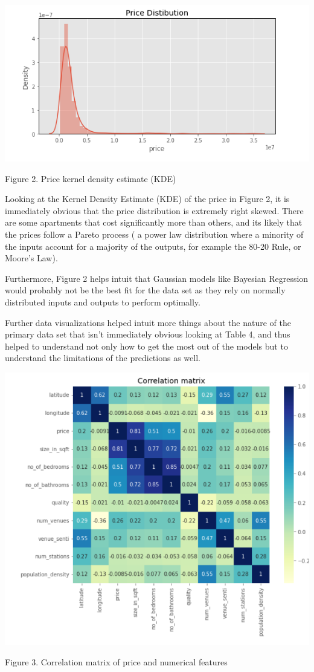 \documentclass[conference]{IEEEtran}
\begin{document}
\smallbreak
\smallbreak
\smallbreak
\includegraphics[scale = 0.6]{images/pricefig.png}
\smallbreak
\caption {Figure 2. Price kernel density estimate (KDE)}
\smallbreak
\smallbreak
\smallbreak

Looking at the Kernel Density Estimate (KDE) of the price in Figure 2, it is immediately obvious that the price distribution is extremely right skewed. There are some apartments that cost significantly more than others, and its likely that the prices follow a Pareto process ( a power law distribution where a minority of the inputs account for a majority of the outputs, for example the 80-20 Rule, or Moore's Law). 

Furthermore, Figure 2 helps intuit that Gaussian models like Bayesian Regression would probably not be the best fit for the data set as they rely on normally distributed inputs and outputs to perform optimally.

Further data visualizations helped intuit more things about the nature of the primary data set that isn't immediately obvious looking at Table 4, and thus helped to understand not only how to get the most out of the models but to understand the limitations of the predictions as well. 

\smallbreak
\smallbreak
\smallbreak
\includegraphics[scale = 0.45]{images/numerical_features_corrmat.png}
\smallbreak
\caption {Figure 3. Correlation matrix of price and numerical features}
\smallbreak
\smallbreak
\smallbreak
\end{document}
